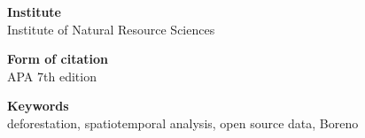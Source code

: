 \thispagestyle{empty}
\vspace*{\fill}


\vspace{0.5cm}

\noindent\textbf{Institute}\\
Institute of Natural Resource Sciences

\noindent\textbf{Form of citation}\\
APA 7th edition

\noindent\textbf{Keywords}\\
deforestation, spatiotemporal analysis, open source data, Boreno
